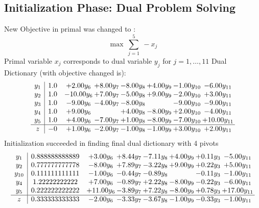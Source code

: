 \documentclass[8pt]{article}
\begin{document}
\subsection{Initialization Phase: Dual Problem Solving}
New Objective in primal was changed to : \[ \max\ \sum_{j=1}^{5}\ - x_j \] 
Primal variable $x_j$ corresponds to dual variable $y_j$ for $j = 1,\ldots,11$
Dual Dictionary (with objective changed is): 
\[\begin{array}{c| c c@{\hskip 2pt} c@{\hskip 2pt} c@{\hskip 2pt} c@{\hskip 2pt} c@{\hskip 2pt} c@{\hskip 2pt} }
 y_{1}   &  1.0 & +  2.00 y_{6} & +  8.00 y_{7} & -8.00 y_{8} & +  4.00 y_{9} & -1.00 y_{10} & -6.00 y_{11}\\
 y_{2}   &  1.0 & -10.00 y_{6} & +  7.00 y_{7} & -5.00 y_{8} & +  9.00 y_{9} & -2.00 y_{10} & +  3.00 y_{11}\\
 y_{3}   &  1.0 & -9.00 y_{6} & -4.00 y_{7} & -8.00 y_{8} &   & -9.00 y_{10} & -9.00 y_{11}\\
 y_{4}   &  1.0 & +  9.00 y_{6} &   & +  4.00 y_{8} & -8.00 y_{9} & +  2.00 y_{10} & -4.00 y_{11}\\
 y_{5}   &  1.0 & +  4.00 y_{6} & -7.00 y_{7} & +  1.00 y_{8} & -8.00 y_{9} & -7.00 y_{10} & + 10.00 y_{11}\\
\hline
z    &  -0 & +  1.00 y_{6} & -2.00 y_{7} & -1.00 y_{8} & -1.00 y_{9} & +  3.00 y_{10} & +  2.00 y_{11}\\
\end{array}\]
Initialization succeeded in finding final dual dictionary with 4 pivots
\[\begin{array}{c| c c@{\hskip 2pt} c@{\hskip 2pt} c@{\hskip 2pt} c@{\hskip 2pt} c@{\hskip 2pt} c@{\hskip 2pt} }
 y_{1}   &  0.888888888889 & +  3.00 y_{6} & +  8.44 y_{7} & -7.11 y_{8} & +  4.00 y_{9} & +  0.11 y_{3} & -5.00 y_{11}\\
 y_{2}   &  0.777777777778 & -8.00 y_{6} & +  7.89 y_{7} & -3.22 y_{8} & +  9.00 y_{9} & +  0.22 y_{3} & +  5.00 y_{11}\\
 y_{10}   &  0.111111111111 & -1.00 y_{6} & -0.44 y_{7} & -0.89 y_{8} &   & -0.11 y_{3} & -1.00 y_{11}\\
 y_{4}   &  1.22222222222 & +  7.00 y_{6} & -0.89 y_{7} & +  2.22 y_{8} & -8.00 y_{9} & -0.22 y_{3} & -6.00 y_{11}\\
 y_{5}   &  0.222222222222 & + 11.00 y_{6} & -3.89 y_{7} & +  7.22 y_{8} & -8.00 y_{9} & +  0.78 y_{3} & + 17.00 y_{11}\\
\hline
z    &  0.333333333333 & -2.00 y_{6} & -3.33 y_{7} & -3.67 y_{8} & -1.00 y_{9} & -0.33 y_{3} & -1.00 y_{11}\\
\end{array}\]
\end{document}
